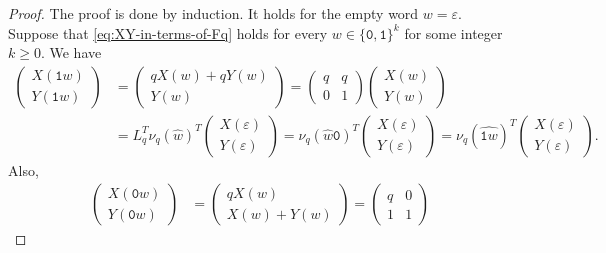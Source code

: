 \documentclass[a4paper,12pt]{amsart}
\newcommand{\0}{\mathtt{0}}
\newcommand{\1}{\mathtt{1}}
\newcommand{\2}{\mathtt{2}}
\newcommand{\3}{\mathtt{3}}
\begin{document}
    \begin{proof}
        The proof is done by induction.
        It holds for the empty word $w=\varepsilon$.
        Suppose that \eqref{eq:XY-in-terms-of-Fq} holds
        for every $w\in\{\0,\1\}^k$ for some integer $k\geq0$.
        We have
    \begin{align*}
        \left(\begin{array}{r}
        X(\1 w)\\
        Y(\1 w)
        \end{array}\right)
        &=
        \left(\begin{array}{r}
        qX(w)+qY(w)\\
        Y(w)
        \end{array}\right)
        = \left(\begin{array}{rr} q & q\\0 & 1 \end{array}\right)
        \left(\begin{array}{r}
        X(w)\\
        Y(w)
        \end{array}\right)\\
        &= L_q^T
          \nu_q(\widehat{w})^T
          \left(\begin{array}{r} X(\varepsilon)\\ Y(\varepsilon) \end{array}\right)
        = \nu_q(\widehat{w}\0)^T
          \left(\begin{array}{r} X(\varepsilon)\\ Y(\varepsilon) \end{array}\right)
        = \nu_q(\widehat{\1 w})^T
          \left(\begin{array}{r} X(\varepsilon)\\ Y(\varepsilon) \end{array}\right).
    \end{align*}
    Also,
    \begin{align*}
        \left(\begin{array}{r}
        X(\0 w)\\
        Y(\0 w)
        \end{array}\right)
        &=
        \left(\begin{array}{r}
        qX(w)\\
        X(w)+Y(w)
        \end{array}\right)
        = \left(\begin{array}{rr} q & 0\\1 & 1 \end{array}\right)

\end{align*}
\end{proof}
\end{document}
